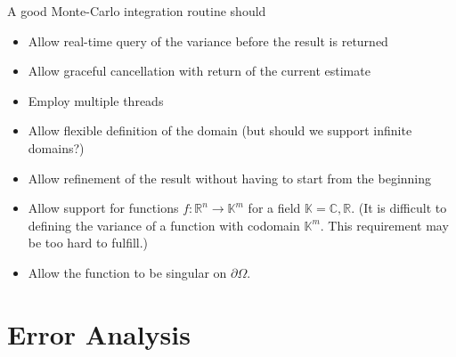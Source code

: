 \documentclass[landscape]{article}
\numberwithin{equation}{section}
\begin{document}
A good Monte-Carlo integration routine should
\begin{itemize}
\item Allow real-time query of the variance before the result is returned
\item Allow graceful cancellation with return of the current estimate
\item Employ multiple threads
\item Allow flexible definition of the domain (but should we support infinite domains?)
\item Allow refinement of the result without having to start from the beginning
\item Allow support for functions $f\colon \mathbb{R}^{n} \to \mathbb{K}^{m}$ for a field $\mathbb{K} = \mathbb{C},\mathbb{R}$. (It is difficult to defining the variance of a function with codomain $\mathbb{K}^{m}$. This requirement may be too hard to fulfill.)
\item Allow the function to be singular on $\partial \Omega$.
\end{itemize}


\section{Error Analysis}
\end{document}
